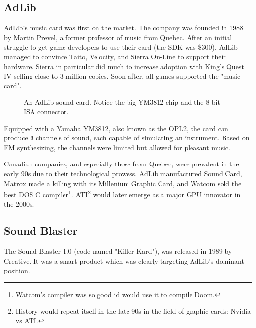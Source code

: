 \documentclass[book.tex]{subfiles}
\begin{document}
  \subsection{AdLib}
  AdLib's music card was first on the market. The company was founded in 1988 by Martin Prevel, a former professor of music from Quebec. After an initial struggle to get game developers to use their card (the SDK was \$300), AdLib managed to convince Taito, Velocity, and Sierra On-Line to support their hardware. Sierra in particular did much to increase adoption with King's Quest IV selling close to 3 million copies. Soon after, all games supported the "music card".\\
  \par

  \begin{figure}[H] 
    \centering 
    \caption{An AdLib sound card. Notice the big YM3812 chip and the 8 bit ISA connector.}
  \end{figure}
   \par
      Equipped with a Yamaha YM3812, also known as the OPL2, the card can produce 9 channels of sound, each capable of simulating an instrument. Based on FM synthesizing, the channels were limited but allowed for pleasant music.\\
\par
{} Canadian companies, and especially those from Quebec, were prevalent in the early 90s due to their technological prowess. AdLib manufactured Sound Card, Matrox made a killing with its Millenium Graphic Card, and Watcom sold the best DOS C compiler\footnote{Watcom's compiler was so good id would use it to compile Doom.}. ATI\footnote{History would repeat itself in the late 90s in the field of graphic cards: Nvidia vs ATI.} would later emerge as a major GPU innovator in the 2000s.\\
  
  


  \subsection{Sound Blaster}
  The Sound Blaster 1.0 (code named "Killer Kard"), was released in 1989 by Creative. It was a smart product which was clearly targeting AdLib's dominant position.\\ 
\par
\end{document}
